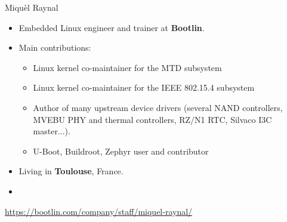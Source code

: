 \begin{frame}{Miquèl Raynal}
  \begin{itemize}
    \item Embedded Linux engineer and trainer at {\bf Bootlin}.
    \item Main contributions:
    \begin{itemize}
      \item Linux kernel co-maintainer for the MTD subsystem
      \item Linux kernel co-maintainer for the IEEE 802.15.4 subsystem
      \item Author of many upstream device drivers (several NAND
        controllers, MVEBU PHY and thermal controllers, RZ/N1 RTC,
        Silvaco I3C master...).
      \item U-Boot, Buildroot, Zephyr user and contributor
    \end{itemize}
    \item Living in {\bf Toulouse}, France.
    \item {}
  \end{itemize}
  {\small \url{https://bootlin.com/company/staff/miquel-raynal/}}
\end{frame}
